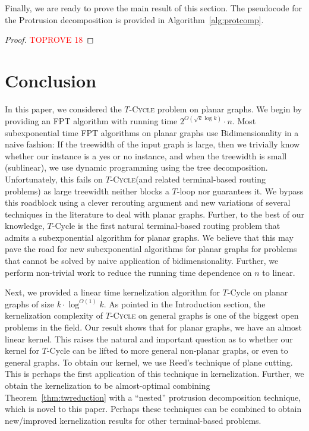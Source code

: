 \documentclass{article}
\numberwithin{claimcounter}{lemma}
\newcommand{\tcycle}{$T$-\textsc{Cycle}\xspace}
\begin{document}
Finally, we are ready to prove the main result of this section. The pseudocode for the Protrusion decomposition is provided in Algorithm~\ref{alg:protcomp}.

\mainKernel*
\begin{proof}\textcolor{red}{TOPROVE 18}\end{proof}













\section{Conclusion} \label{sec:conc}
In this paper, we considered the \tcycle problem on planar graphs. 
We begin by providing an FPT algorithm with running time $2^{O(\sqrt{k} \log k)}\cdot n$. Most subexponential time FPT algorithms on planar graphs use Bidimensionality in a naive fashion: If the treewidth of the input graph is large, then we trivially know whether our instance is a yes or no instance, and when the treewidth is small (sublinear), we use dynamic programming using the tree decomposition. Unfortunately, this fails on \tcycle (and related terminal-based routing problems) as large treewidth neither blocks a $T$-loop nor guarantees it. We bypass this roadblock using a clever rerouting argument and new variations of several techniques in the literature to deal with planar graphs. Further, to the best of our knowledge, {\sc $T$-Cycle} is the first natural terminal-based routing problem that admits a subexponential algorithm for planar graphs. We believe that this may pave the road for new subexponential algorithms for planar graphs for problems that cannot be solved by naive application of bidimensionality. Further, we perform non-trivial work to reduce the running time dependence on $n$ to linear. 





 



Next, we provided a linear time kernelization algorithm for {\sc $T$-Cycle} on planar graphs of size $k\cdot \log^{O(1)}k$. As pointed in the Introduction section, the kernelization complexity of \tcycle on general graphs is one of the biggest open problems in the field. Our result shows that for planar graphs, we  have an almost linear kernel. This raises the natural and important question as to whether our kernel for {\sc $T$-Cycle} can be lifted to more general non-planar graphs, or even to general graphs. To obtain our kernel, we use  Reed's technique of plane cutting. This is perhaps the first application of this technique in kernelization. Further, we obtain the kernelization to be almost-optimal combining Theorem~\ref{thm:twreduction} with a ``nested'' protrusion decomposition technique, which is  novel to this paper. Perhaps these techniques can be combined to obtain new/improved kernelization results for other terminal-based problems. 
\end{document}
